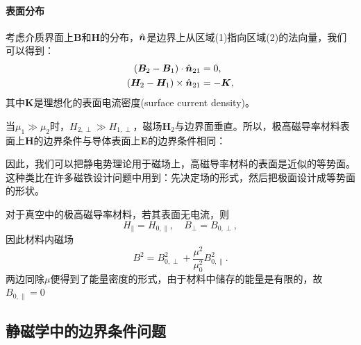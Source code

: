 \paragraph{表面分布}

考虑介质界面上$\bm B$和$\bm H$的分布，$\mathop{}\!\hat{\bm{n}}$是边界上从区域(1)指向区域(2)的法向量，我们可以得到：
\begin{subequations}
    \begin{align}
        \label{eqn:Bn2-Bn1}
        (\bm B_2 - \bm B_1) \cdot \mathop{}\!\hat{\bm{n}}_{21} &= 0,\\
        \label{eqn:Ht2-Ht1}
        (\bm H_2 - \bm H_1) \times \mathop{}\!\hat{\bm{n}}_{21} &= -\bm K,
    \end{align}
\end{subequations}
其中$\bm K$是理想化的表面电流密度(surface current density)。

当$\mu_1 \gg \mu_2$时，$H_{2,\perp} \gg H_{1,\perp}$，磁场$\bm H_2$与边界面垂直。所以，极高磁导率材料表面上$\bm H$的边界条件与导体表面上$\bm E$的边界条件相同：
\begin{notecaptionblock}
    \label{fig:H between magnetic surfaces}
\end{notecaptionblock}
因此，我们可以把静电势理论用于磁场上，高磁导率材料的表面是近似的等势面。这种类比在许多磁铁设计问题中用到：先决定场的形式，然后把极面设计成等势面的形状。
\begin{example}{}{}
    对于真空中的极高磁导率材料，若其表面无电流，则
    \[
        H_\parallel = H_{0,\parallel},\quad B_\perp = B_{0,\perp},
    \]
    因此材料内磁场
    \[
        B^2 = B_{0,\perp}^2 + \frac{\mu^2}{\mu_0^2}B_{0,\parallel}^2.
    \]
    两边同除$\mu$便得到了能量密度的形式，由于材料中储存的能量是有限的，故$B_{0,\parallel} = 0$
\end{example}

\subsection{静磁学中的边界条件问题}
\label{ssec:boundary-value problems in magnetostatics}

